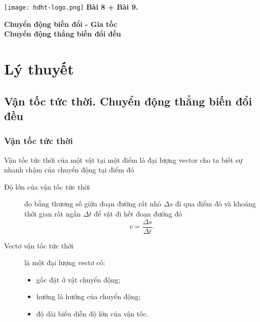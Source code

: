 \newcommand{\chapter}[2][]{
	\newcommand{\chapname}{#2}
	\begin{flushleft}
		\begin{minipage}[t]{\linewidth}
			\texttt{[image: hdht-logo.png]}
			\hspace{0pt}	
			\sffamily\bfseries\large Bài  8 + Bài 9.
			\begin{flushleft}
				\huge\bfseries #1
			\end{flushleft}
		\end{minipage}
	\end{flushleft}
	\vspace{1cm}
	\normalfont\normalsize
}
\chapter[Chuyển động biến đổi - Gia tốc \\ Chuyển động thẳng biến đổi đều]{Chuyển động biến đổi -  Gia tốc \\ Chuyển động thẳng biến đổi đều}
\section{Lý thuyết}
\subsection{Vận tốc tức thời. Chuyển động thẳng biến đổi đều}
\vspace*{-1em}
\subsubsection{Vận tốc tức thời}
	Vận tốc tức thời của một vật tại một điểm là đại lượng vector cho ta biết sự nhanh chậm của chuyển động tại điểm đó
	\begin{description}
		\item[Độ lớn của vận tốc tức thời] đo bằng thương số giữa đoạn đường rất nhỏ $\Delta s$ đi qua điểm đó và khoảng thời gian rất ngắn $\Delta t$ để vật đi hết đoạn đường đó 
			\begin{equation*}
				v=\dfrac{\Delta s}{\Delta t}.
			\end{equation*}	
		\item[Vectơ vận tốc tức thời] là một đại lượng vectơ có:
		\begin{itemize}
			\item gốc đặt ở vật chuyển động;
			\item hướng là hướng của chuyển động;
			\item độ dài biểu diễn độ lớn của vận tốc.
		\end{itemize}
	\end{description}
